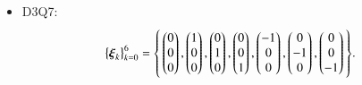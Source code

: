 \begin{itemize}
\begin{align}
\begin{split}
                    \end{split}
            \end{align}
            \item[] D3Q7: \begin{align}
                \label{eq:VelModD3Q7}
                    \left\{\boldsymbol{\xi}_k\right\}_{k=0}^{6} = \vast\{ &\begin{pmatrix} 0 \\ 0 \\ 0 \end{pmatrix}, \begin{pmatrix} 1 \\ 0 \\ 0 \end{pmatrix}, \begin{pmatrix} 0 \\ 1 \\ 0 \end{pmatrix}, \begin{pmatrix} 0 \\ 0 \\ 1 \end{pmatrix}, \begin{pmatrix} -1 \\ 0 \\ 0 \end{pmatrix}, \begin{pmatrix} 0 \\ -1 \\ 0 \end{pmatrix}, \begin{pmatrix} 0 \\ 0 \\ -1 \end{pmatrix} \vast\}.
                \end{align}
        \end{itemize}
        
